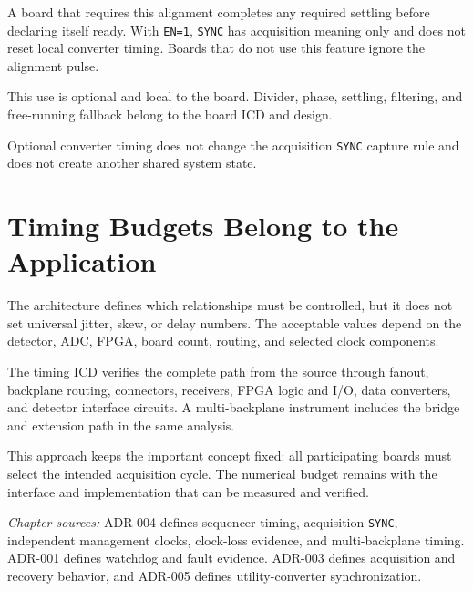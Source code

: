 A board that requires this alignment completes any required settling before declaring itself ready. With \texttt{EN=1}, \texttt{SYNC} has acquisition meaning only and does not reset local converter timing. Boards that do not use this feature ignore the alignment pulse.

This use is optional and local to the board. Divider, phase, settling, filtering, and free-running fallback belong to the board ICD and design.

Optional converter timing does not change the acquisition \texttt{SYNC} capture rule and does not create another shared system state.

\section{Timing Budgets Belong to the Application}

The architecture defines which relationships must be controlled, but it does not set universal jitter, skew, or delay numbers. The acceptable values depend on the detector, ADC, FPGA, board count, routing, and selected clock components.

The timing ICD verifies the complete path from the source through fanout, backplane routing, connectors, receivers, FPGA logic and I/O, data converters, and detector interface circuits. A multi-backplane instrument includes the bridge and extension path in the same analysis.

This approach keeps the important concept fixed: all participating boards must select the intended acquisition cycle. The numerical budget remains with the interface and implementation that can be measured and verified.

\medskip
\noindent\textit{Chapter sources:} ADR-004 defines sequencer timing, acquisition \texttt{SYNC}, independent management clocks, clock-loss evidence, and multi-backplane timing. ADR-001 defines watchdog and fault evidence. ADR-003 defines acquisition and recovery behavior, and ADR-005 defines utility-converter synchronization.
